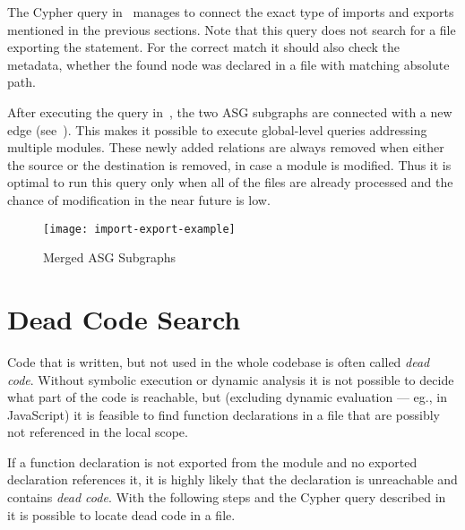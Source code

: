 The Cypher query in~ manages to connect the exact type of imports and exports mentioned in the previous sections. Note that this query does not search for a file exporting the statement. For the correct match it should also check the metadata, whether the found node was declared in a file with matching absolute path.

\begin{figure}[!htb]
	\begin{minipage}{\textwidth}
		
	\end{minipage}
\end{figure}

After executing the query in~, the two ASG subgraphs are connected with a new edge (see~). This makes it possible to execute global-level queries addressing multiple modules. These newly added relations are always removed when either the source or the destination is removed, in case a module is modified. Thus it is optimal to run this query only when all of the files are already processed and the chance of modification in the near future is low.

\begin{sidewaysfigure}[htbp]
  \centering
  \texttt{[image: import-export-example]}
  \caption{Merged ASG Subgraphs}
  \label{fig:import-export-example}
\end{sidewaysfigure}


\section{Dead Code Search}
\label{sect:dead-code-search}
Code that is written, but not used in the whole codebase is often called \emph{dead code}. Without symbolic execution or dynamic analysis it is not possible to decide what part of the code is reachable, but (excluding dynamic evaluation --- eg.,  in JavaScript) it is feasible to find function declarations in a file that are possibly not referenced in the local scope.

If a function declaration is not exported from the module and no exported declaration references it, it is highly likely that the declaration is unreachable and contains \emph{dead code}. With the following steps and the Cypher query described in~ it is possible to locate dead code in a file.

